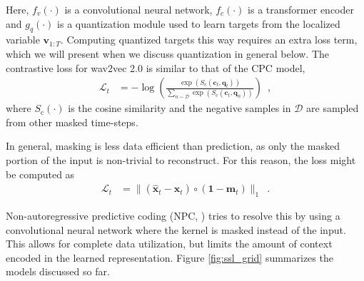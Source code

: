 \noindent Here, $f_v(\cdot)$ is a convolutional neural network, $f_c(\cdot)$ is a transformer encoder \cite{vaswani2017attention} and $g_q(\cdot)$ is a quantization module used to learn targets from the localized variable $\mathbf{v}_{1:T}$. Computing quantized targets this way requires an extra loss term, which we will present when we discuss quantization in general below. The contrastive loss for wav2vec 2.0 is similar to that of the CPC model,
%
\begin{align}
    \mathcal{L}_t &= - \log \left(\frac{\exp(S_{\text{c}}(\mathbf{c}_{t}, \mathbf{q}_{t}))}{\sum_{n \sim \mathcal{D}} \exp(S_{\text{c}}(\mathbf{c}_{t}, \mathbf{q}_{n}))} \right) \enspace , \label{w2v2 loss}
\end{align}
%
\noindent where $S_{\text{c}}(\cdot)$ is the cosine similarity and the negative samples in $\mathcal{D}$ are sampled from other masked time-steps. 

In general, masking is less data efficient than prediction, as only the masked portion of the input is non-trivial to reconstruct. For this reason, the loss might be computed as
%
\begin{align}
    \mathcal{L}_t &= \lVert (\mathbf{\hat{x}}_{t} - \mathbf{x}_{t}) \circ (\mathbf{1} - \mathbf{m}_t) \rVert_1 \enspace .
\end{align}

\noindent Non-autoregressive predictive coding (NPC, \citealp{liu2020non}) tries to resolve this by using a convolutional neural network where the kernel is masked instead of the input.
This allows for complete data utilization, but limits the amount of context encoded in the learned representation.
Figure \ref{fig:ssl_grid} summarizes the models discussed so far.

